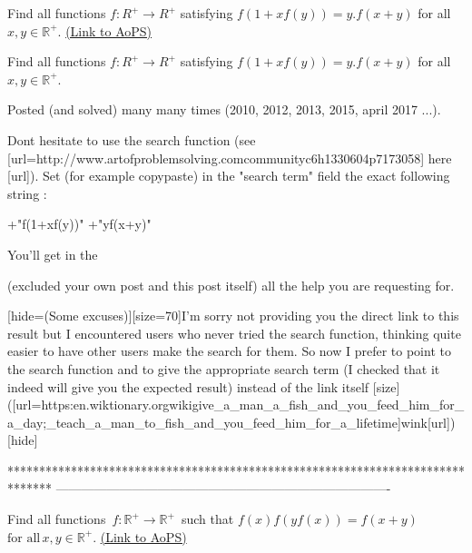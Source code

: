 \begin{problem}
	Find all functions $f:R^+\rightarrow R^+$ satisfying 
$f(1+xf(y))=y.f(x+y)$ for all $x,y\in\mathbb{R^+} $.
	\flushright \href{https://artofproblemsolving.com/community/c6h1571116}{(Link to AoPS)}
\end{problem}



\begin{solution}
	\begin{tcolorbox}Find all functions $f:R^+\rightarrow R^+$ satisfying 
$f(1+xf(y))=y.f(x+y)$ for all $x,y\in\mathbb{R^+} $.\end{tcolorbox}
Posted (and solved) many many times (2010, 2012, 2013, 2015, april 2017 ...).

Dont hesitate to use the search function (see [url=http://www.artofproblemsolving.com\/community\/c6h1330604p7173058] here [\/url]).
Set (for example copy\/paste) in the "search term" field the exact following string : 

+"f(1+xf(y))" +"yf(x+y)"

You'll get in the  (excluded your own post and this post itself) all the help you are requesting for.

[hide=(Some excuses)][size=70]I'm sorry not providing you the direct link to this result but I encountered users who never tried the search function, thinking quite easier to have other users make the search for them. So now I prefer to point to the search function and to give the appropriate search term (I checked that it indeed will give you the expected result) instead of the link itself [\/size]([url=https:\/\/en.wiktionary.org\/wiki\/give_a_man_a_fish_and_you_feed_him_for_a_day;_teach_a_man_to_fish_and_you_feed_him_for_a_lifetime]wink[\/url])[\/hide]




\end{solution}
*******************************************************************************
-------------------------------------------------------------------------------

\begin{problem}
	Find all functions $ \,f: {\mathbb{R^+}}\rightarrow{\mathbb{R^+}}\,$ such that
$f(x)f(yf(x))=f(x+y)$ $ \text{for all}\,x,y\in\mathbb{R^+}.$
	\flushright \href{https://artofproblemsolving.com/community/c6h1571168}{(Link to AoPS)}
\end{problem}




